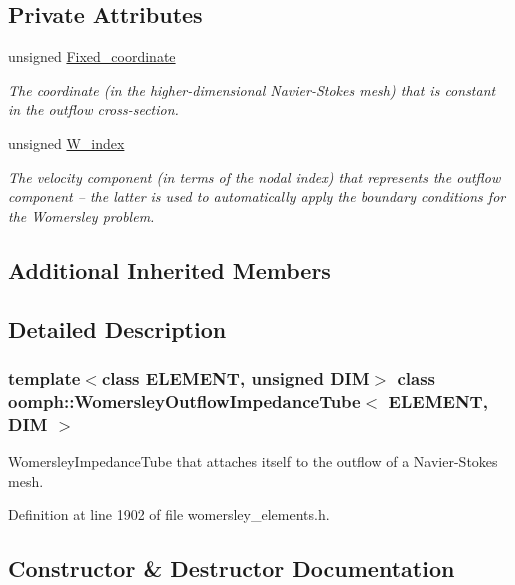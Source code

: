 \subsection*{Private Attributes}
\begin{DoxyCompactItemize}
\item 
unsigned \hyperlink{classoomph_1_1WomersleyOutflowImpedanceTube_aaed332bd590c1d300cd796a799ae9db8}{Fixed\+\_\+coordinate}
\begin{DoxyCompactList}\small\item\em The coordinate (in the higher-\/dimensional Navier-\/\+Stokes mesh) that is constant in the outflow cross-\/section. \end{DoxyCompactList}\item 
unsigned \hyperlink{classoomph_1_1WomersleyOutflowImpedanceTube_ab695df8342d00c65a16d79af35c49ad1}{W\+\_\+index}
\begin{DoxyCompactList}\small\item\em The velocity component (in terms of the nodal index) that represents the outflow component -- the latter is used to automatically apply the boundary conditions for the Womersley problem. \end{DoxyCompactList}\end{DoxyCompactItemize}
\subsection*{Additional Inherited Members}


\subsection{Detailed Description}
\subsubsection*{template$<$class E\+L\+E\+M\+E\+NT, unsigned D\+IM$>$\newline
class oomph\+::\+Womersley\+Outflow\+Impedance\+Tube$<$ E\+L\+E\+M\+E\+N\+T, D\+I\+M $>$}

Womersley\+Impedance\+Tube that attaches itself to the outflow of a Navier-\/\+Stokes mesh. 

Definition at line 1902 of file womersley\+\_\+elements.\+h.



\subsection{Constructor \& Destructor Documentation}
\mbox{\label{classoomph_1_1WomersleyOutflowImpedanceTube_a43c6028b6a11ae3c73b26271f0176c58}} 
